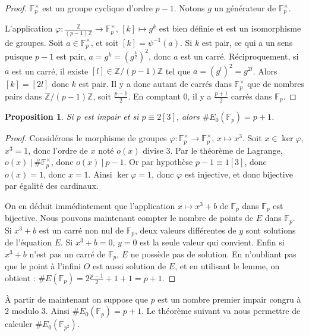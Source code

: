 \documentclass{article}
\theoremstyle{plain}%
\newtheorem{prop}[thm]{Proposition}
\theoremstyle{definition}%
\newcommand{\F}{\mathbb{F}}
\newcommand{\Z}{\mathbb{Z}}
\begin{document}
\begin{proof}
  $\F_{p}^\times$ est un groupe cyclique d'ordre $p-1$. 
  Notons $g$ un générateur de $\F_{p}^\times$. 
  
  L'application $ \varphi \colon \frac{\Z}{(p-1)\Z} \to \F_{p}^\times$,
  $[k] \mapsto g^k$
  est bien définie et est un isomorphisme de groupes.
  Soit $a\in \F_{p}^\times$, et soit $[k] = \psi^{-1}(a)$.
  Si $k$ est pair, ce qui a un sens puisque $p-1$ est pair, $a = g^k = (g^\frac{k}{2})^2$, donc $a$ est un carré.
  Réciproquement, si $a$ est un carré, il existe $[l]\in \Z/(p-1)\Z$ tel que $a = (g^l)^2 = g^{2l}$.
  Alors $[k] = [2l]$ donc $k$ est pair.
  Il y a donc autant de carrés dans $\F_{p}^\times$ que de nombres pairs dans $\Z/{(p-1)\Z}$, soit $\frac{p-1}{2}$. 
  En comptant $0$, il y a $\frac{p+1}{2}$ carrés dans $\F_{p}$. 
\end{proof}

\begin{prop}
  Si $p$ est impair et si $p \equiv 2 [3]$, alors $\#E_0(\F_{p}) = p+1$.
\end{prop}

\begin{proof}
  Considérons le morphisme de groupes $\varphi \colon \F_{p}^\times \to \F_{p}^\times$, $x \mapsto x^3$. 
  Soit $x\in \ker \varphi$, $x^3 = 1$, donc l'ordre de $x$ noté $o(x)$ divise $3$. 
  Par le théorème de Lagrange, $o(x)\ |\ \#\F_{p}^\times$, donc $o(x)\ |\ p-1$. 
  Or par hypothèse $p-1\equiv 1[3]$, donc $o(x) = 1$, donc $x = 1$.
  Ainsi $\ker \varphi = {1}$, donc $\varphi$ est injective, et donc bijective par égalité des cardinaux.

  On en déduit immédiatement que l'application $x \mapsto x^3 + b$ de $\F_{p}$ dans $\F_{p}$ est bijective.
  Nous pouvons maintenant compter le nombre de points de $E$ dans $\F_{p}$. 
  Si $x^3 + b$ est un carré non nul de $\F_{p}$, deux valeurs différentes de $y$ sont solutions de l'équation $E$. 
  Si $x^3 + b = 0$, $y = 0$ est la seule valeur qui convient.
  Enfin si $x^3 + b$ n'est pas un carré de $\F_{p}$, $E$ ne possède pas de solution.
  En n'oubliant pas que le point à l'infini $O$ est aussi solution de $E$, et en utilisant le lemme, on obtient : $\#E(\F_{p}) = 2\frac{p-1}{2} + 1 + 1 = p+1$.
\end{proof}

À partir de maintenant on suppose que $p$ est un nombre premier impair congru à $2$ modulo $3$. 
Ainsi $\#E_0(\F_{p}) = p+1$. 
Le théorème suivant va nous permettre de calculer $\#E_0(\F_{p^2})$. 
\end{document}
